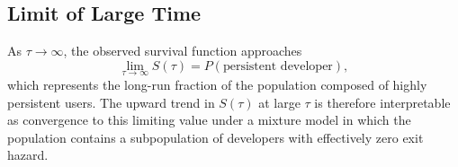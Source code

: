 \documentclass[12pt,a4paper]{article}
\begin{document}
\subsection{Limit of Large Time}

As $\tau \to \infty$, the observed survival function approaches
\[
\lim_{\tau \to \infty} S(\tau) = P(\text{persistent developer}),
\]
which represents the long-run fraction of the population composed of highly persistent users. The upward trend in $S(\tau)$ at large $\tau$ is therefore interpretable as convergence to this limiting value under a mixture model in which the population contains a subpopulation of developers with effectively zero exit hazard.
\end{document}
